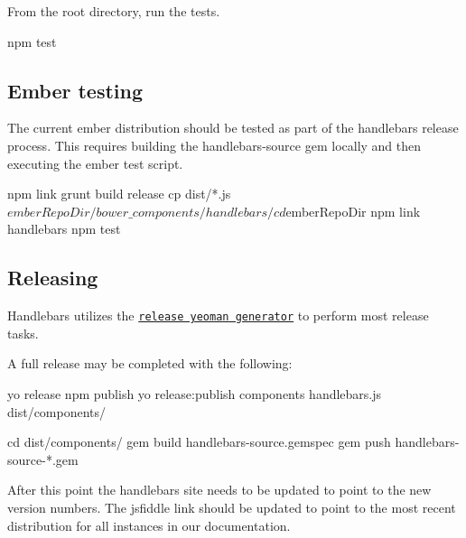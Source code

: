 From the root directory, run the tests. 
\begin{DoxyCode}
npm test
\end{DoxyCode}


\subsection*{Ember testing}

The current ember distribution should be tested as part of the handlebars release process. This requires building the {\ttfamily handlebars-\/source} gem locally and then executing the ember test script.


\begin{DoxyCode}
npm link
grunt build release
cp dist/*.js $emberRepoDir/bower\_components/handlebars/

cd $emberRepoDir
npm link handlebars
npm test
\end{DoxyCode}


\subsection*{Releasing}

Handlebars utilizes the \href{https://github.com/walmartlabs/generator-release}{\tt release yeoman generator} to perform most release tasks.

A full release may be completed with the following\+:


\begin{DoxyCode}
yo release
npm publish
yo release:publish components handlebars.js dist/components/

cd dist/components/
gem build handlebars-source.gemspec
gem push handlebars-source-*.gem
\end{DoxyCode}


After this point the handlebars site needs to be updated to point to the new version numbers. The jsfiddle link should be updated to point to the most recent distribution for all instances in our documentation. 